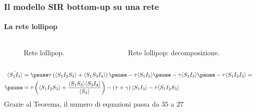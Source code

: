 \documentclass{beamer}
\newcommand{\angol}[1]{\langle #1 \rangle}
\newcommand{\tonde}[1]{\left( #1 \right)}
\theoremstyle{definition}
\theoremstyle{plain}
\begin{document}
\begin{frame}
\frametitle{Il modello SIR bottom-up su una rete}
\framesubtitle{La rete lollipop}
\begin{columns}
\begin{column}{0.5\textwidth}
   \begin{figure}
\centering
{}
\caption{Rete lollipop.}
\end{figure}

\end{column}
\pause
\begin{column}{0.5\textwidth}  %
\begin{figure}[!htb]
\centering
{}
\caption{Rete lollipop: decomposizione.}
\end{figure}
\end{column}
\end{columns}
\pause
\begin{equation*}
 \begin{aligned}	
 \dot{\angol{S_1I_3}}&=
 \pause  \tau\tonde{ \angol{S_1I_2S_3} 
+ \angol{S_1S_3I_4}} \pause -  \tau  \angol{S_1I_3} \pause - \gamma\angol{S_1 I_3}\pause -\tau \angol{ S_1 I_2 I_3}= \\ \pause
 &= \tau \tonde{ \angol{S_1I_2S_3} + \frac{ \angol{S_1S_3}\angol{S_3 I_4}}{\angol{S_3}}} -\tonde{ \tau + \gamma} \angol{S_1I_3} - \tau \angol{S_1I_2S_3}
 \end{aligned}
 \end{equation*}
\pause
Grazie al Teorema,  il numero di equazioni passa da $35$ a $27$
\end{frame}
\end{document}
